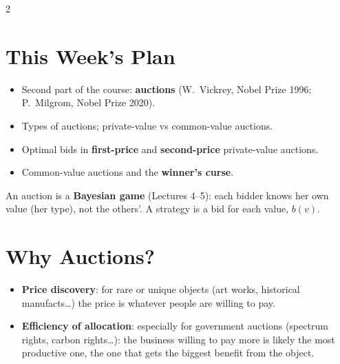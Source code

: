 \documentclass[a4paper,9pt]{extarticle}
\begin{document}

\thispagestyle{fancy}



\begin{multicols}{2}



\section{This Week's Plan}


\begin{itemize}

\item Second part of the course: \textbf{auctions} (W.\ Vickrey, Nobel Prize 1996;
P.\ Milgrom, Nobel Prize 2020).

\item Types of auctions; private-value vs common-value auctions.

\item Optimal bids in \textbf{first-price} and \textbf{second-price} private-value auctions.

\item Common-value auctions and the \textbf{winner's curse}.

\end{itemize}


\begin{important}

An auction is a \textbf{Bayesian game} (Lectures 4--5): each bidder knows her own value (her
type), not the others'. A strategy is a bid for each value, $b(v)$.

\end{important}



\section{Why Auctions?}


\begin{itemize}

\item \textbf{Price discovery}: for rare or unique objects (art works, historical
manufacts\dots) the price is whatever people are willing to pay.

\item \textbf{Efficiency of allocation}: especially for government auctions (spectrum rights,
carbon rights\dots): the business willing to pay more is likely the most productive one, the
one that gets the biggest benefit from the object.


\end{itemize}
\end{multicols}
\end{document}
